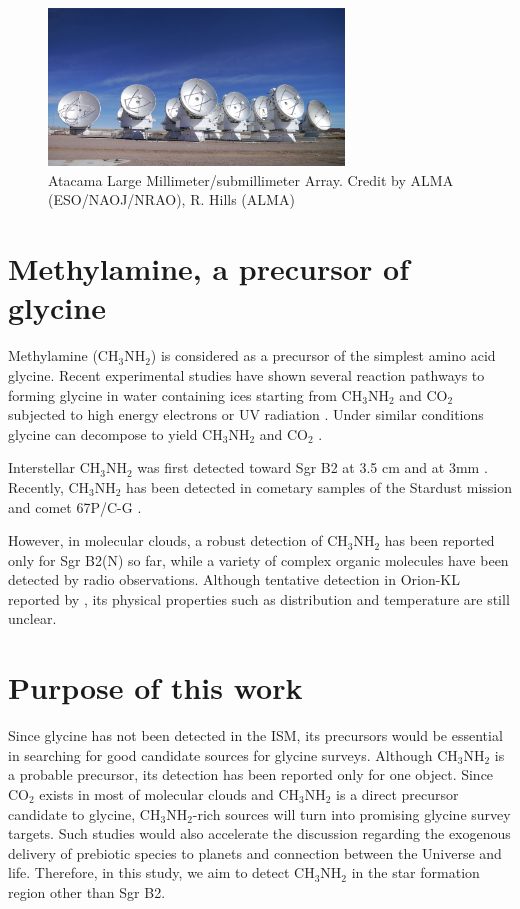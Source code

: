 \begin{figure}[H]
  \centering
  \includegraphics[width=0.7\textwidth]{ALMA.eps}
  \caption{Atacama Large Millimeter/submillimeter Array. Credit by ALMA (ESO/NAOJ/NRAO), R. Hills (ALMA)}
\end{figure}

\newpage
\section{Methylamine, a precursor of glycine}
Methylamine (CH$_3$NH$_2$) is considered as a precursor of the simplest amino acid glycine. 
Recent experimental studies have shown several reaction pathways to forming
glycine in water containing ices starting from CH$_3$NH$_2$ and CO$_2$
subjected to high energy electrons \citep{Holtom+2005} or UV radiation \citep{Bossa+2009, Lee+2009}. Under similar conditions glycine can decompose to yield CH$_3$NH$_2$ and CO$_2$
\citep{Ehrenfreund+2001}. 

Interstellar CH$_3$NH$_2$ was first detected toward Sgr B2 at 3.5 cm \citep{Fourikis+1974} 
and at 3mm \citep{Kaifu+1974}. Recently, CH$_3$NH$_2$ has been detected 
in cometary samples of the Stardust mission \citep{Glavin+2008} and comet 67P/C-G \citep{Altwegg+2016, Altwegg+2017}.

However, in molecular clouds, 
a robust detection of CH$_3$NH$_2$ has been reported only for Sgr B2(N) \citep{Halfen+2013}  so far, 
while a variety of complex organic molecules have been detected by radio observations.
Although tentative detection in Orion-KL reported by \citet{Pagani+2017}, its physical properties 
such as distribution and temperature are still unclear.

\newpage
\section{Purpose of this work}
Since glycine has not been detected in the ISM, its precursors would be essential in
searching for good candidate sources for glycine surveys. 
Although CH$_3$NH$_2$  is a probable precursor, its detection has been reported only for one object. 
Since CO$_2$ exists in most of molecular clouds and CH$_3$NH$_2$ is a direct precursor
candidate to glycine, CH$_3$NH$_2$-rich sources will turn into promising glycine survey targets. 
Such studies would also accelerate the discussion regarding the exogenous delivery of 
prebiotic species to planets and connection between the Universe and life.
Therefore, in this study, we aim to detect CH$_3$NH$_2$ in the star formation region other than Sgr B2.

